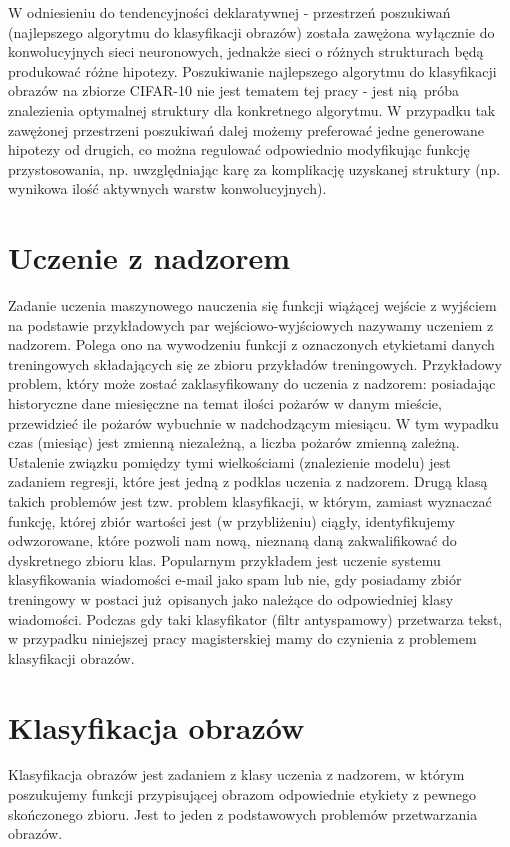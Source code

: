 W odniesieniu do tendencyjności deklaratywnej - przestrzeń poszukiwań (najlepszego algorytmu do klasyfikacji obrazów) została zawężona wyłącznie do konwolucyjnych sieci neuronowych, jednakże sieci o różnych strukturach będą produkować różne hipotezy.
Poszukiwanie najlepszego algorytmu do klasyfikacji obrazów na zbiorze CIFAR-10 nie jest tematem tej pracy - jest nią próba znalezienia optymalnej struktury dla konkretnego algorytmu.
W przypadku tak zawężonej przestrzeni poszukiwań dalej możemy preferować jedne generowane hipotezy od drugich, co można regulować odpowiednio modyfikując funkcję przystosowania, np. uwzględniając karę za komplikację uzyskanej struktury (np. wynikowa ilość aktywnych warstw konwolucyjnych).
\section{Uczenie z nadzorem}\label{supervised_learning}
Zadanie uczenia maszynowego nauczenia się funkcji wiążącej wejście z wyjściem na podstawie przykładowych par wejściowo-wyjściowych nazywamy uczeniem z nadzorem. \cite{russell2010artificial}
Polega ono na wywodzeniu funkcji z oznaczonych etykietami danych treningowych składających się ze zbioru przykładów treningowych. \cite{mohri2012foundations}
Przykładowy problem, który może zostać zaklasyfikowany do uczenia z nadzorem: posiadając historyczne dane miesięczne na temat ilości pożarów w danym mieście, przewidzieć ile pożarów wybuchnie w nadchodzącym miesiącu.
W tym wypadku czas (miesiąc) jest zmienną niezależną, a liczba pożarów zmienną zależną. Ustalenie związku pomiędzy tymi wielkościami (znalezienie modelu) jest zadaniem regresji, które jest jedną z podklas uczenia z nadzorem.
Drugą klasą takich problemów jest tzw. problem klasyfikacji, w którym, zamiast wyznaczać funkcję, której zbiór wartości jest (w przybliżeniu) ciągły, identyfikujemy odwzorowane, które pozwoli nam nową, nieznaną daną zakwalifikować do dyskretnego zbioru klas.
Popularnym przykładem jest uczenie systemu klasyfikowania wiadomości e-mail jako spam lub nie, gdy posiadamy zbiór treningowy w postaci już opisanych jako należące do odpowiedniej klasy wiadomości.
Podczas gdy taki klasyfikator (filtr antyspamowy) przetwarza tekst, w przypadku niniejszej pracy magisterskiej mamy do czynienia z problemem klasyfikacji obrazów.
\section{Klasyfikacja obrazów}
Klasyfikacja obrazów jest zadaniem z klasy uczenia z nadzorem, w którym poszukujemy funkcji przypisującej obrazom odpowiednie etykiety z pewnego skończonego zbioru.
Jest to jeden z podstawowych problemów przetwarzania obrazów.

